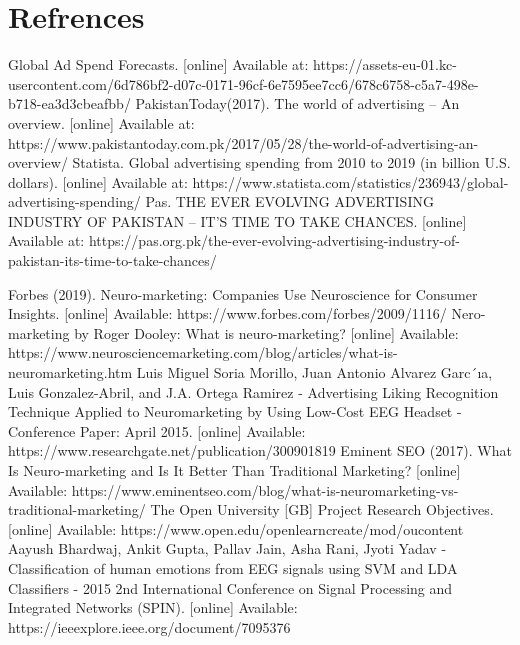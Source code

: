 \documentclass[a4paper, 12pt, oneside]{uet_thesis}
\begin{document}
\chapter{Refrences}
\begin{thebibliography}{00}
 Global Ad Spend Forecasts. [online] Available at: https://assets-eu-01.kc-usercontent.com/6d786bf2-d07c-0171-96cf-6e7595ee7cc6/678c6758-c5a7-498e-b718-ea3d3cbeafbb/
 PakistanToday(2017). The world of advertising – An overview. [online]  Available at: https://www.pakistantoday.com.pk/2017/05/28/the-world-of-advertising-an-overview/
 Statista. Global advertising spending from 2010 to 2019 (in billion U.S. dollars). [online]  Available at: https://www.statista.com/statistics/236943/global-advertising-spending/
 Pas. THE EVER EVOLVING ADVERTISING INDUSTRY OF PAKISTAN – IT’S TIME TO TAKE CHANCES. [online] Available at: https://pas.org.pk/the-ever-evolving-advertising-industry-of-pakistan-its-time-to-take-chances/

Forbes (2019). Neuro-marketing: Companies Use Neuroscience for Consumer Insights. [online] Available: https://www.forbes.com/forbes/2009/1116/
 Nero-marketing by Roger Dooley: What is neuro-marketing? [online] Available: https://www.neurosciencemarketing.com/blog/articles/what-is-neuromarketing.htm
 Luis Miguel Soria Morillo, Juan Antonio Alvarez Garc´ıa, Luis Gonzalez-Abril, and J.A. Ortega Ramirez - Advertising Liking Recognition Technique Applied to Neuromarketing by Using Low-Cost EEG Headset - Conference Paper: April 2015. [online] Available: https://www.researchgate.net/publication/300901819
 Eminent SEO (2017).  What Is Neuro-marketing and Is It Better Than Traditional Marketing? [online] Available: https://www.eminentseo.com/blog/what-is-neuromarketing-vs-traditional-marketing/
The Open University [GB] Project Research Objectives. [online] Available: https://www.open.edu/openlearncreate/mod/oucontent
Aayush Bhardwaj, Ankit Gupta, Pallav Jain, Asha Rani, Jyoti Yadav - Classification of human emotions from EEG signals using SVM and LDA Classifiers  -  2015 2nd International Conference on Signal Processing and Integrated Networks (SPIN). [online] Available: https://ieeexplore.ieee.org/document/7095376


\end{thebibliography}
\end{document}
